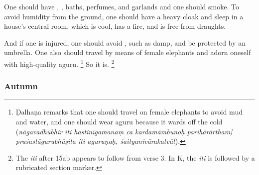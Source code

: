 \begin{translation}
\item[13--14ab] %
One should have , , baths, perfumes, and garlands and one should smoke. To avoid humidity from the ground, one should have a heavy cloak and sleep in a house's central room, which is cool, has a fire, and is free from draughts.
%

\item[14c–f] %
And if one is injured, one should avoid , such as damp, and be protected by an umbrella. One also should travel by means of female elephants and adorn oneself with high-quality \gls{aguru}.%
	\footnote{Ḍalhaṇa \citep[809]{vulgate} remarks that one should travel on female elephants to avoid mud and water, and one should wear \gls{aguru}  because it wards off the cold (\emph{nāgavadhūbhir iti hastinīgamanaṃ ca kardamāmbunoḥ parihārārtham| praśastāgurubhūṣita iti aguruṇaḥ, śaityanivārakatvāt}).} %
So it is.%
	\footnote{The \emph{iti} after 15ab appears to follow from verse 3. In K, the \emph{iti} is followed by a rubricated section marker.}\\

%

\subsubsection{Autumn} %


\end{translation}
